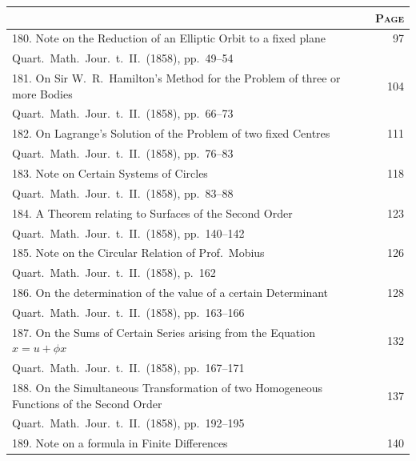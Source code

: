 \documentclass[12pt,a4paper]{article}
\theoremstyle{plain}
\begin{document}
\clearpage

\begin{longtable}{p{}r}
\toprule
\multicolumn{1}{c}{} & \multicolumn{1}{c}{\textsc{Page}} \\
\midrule
\endhead
180. Note on the Reduction of an Elliptic Orbit to a fixed plane \dotfill & 97 \\
\multicolumn{2}{l}{\small Quart.\ Math.\ Jour.\ t.~II.\ (1858), pp.~49--54} \\[0.5em]
%
181. On Sir W.~R.\ Hamilton's Method for the Problem of three or more Bodies \dotfill & 104 \\
\multicolumn{2}{l}{\small Quart.\ Math.\ Jour.\ t.~II.\ (1858), pp.~66--73} \\[0.5em]
%
182. On Lagrange's Solution of the Problem of two fixed Centres \dotfill & 111 \\
\multicolumn{2}{l}{\small Quart.\ Math.\ Jour.\ t.~II.\ (1858), pp.~76--83} \\[0.5em]
%
183. Note on Certain Systems of Circles \dotfill & 118 \\
\multicolumn{2}{l}{\small Quart.\ Math.\ Jour.\ t.~II.\ (1858), pp.~83--88} \\[0.5em]
%
184. A Theorem relating to Surfaces of the Second Order \dotfill & 123 \\
\multicolumn{2}{l}{\small Quart.\ Math.\ Jour.\ t.~II.\ (1858), pp.~140--142} \\[0.5em]
%
185. Note on the Circular Relation of Prof.\ Mobius \dotfill & 126 \\
\multicolumn{2}{l}{\small Quart.\ Math.\ Jour.\ t.~II.\ (1858), p.~162} \\[0.5em]
%
186. On the determination of the value of a certain Determinant \dotfill & 128 \\
\multicolumn{2}{l}{\small Quart.\ Math.\ Jour.\ t.~II.\ (1858), pp.~163--166} \\[0.5em]
%
187. On the Sums of Certain Series arising from the Equation $x = u + \phi x$ \dotfill & 132 \\
\multicolumn{2}{l}{\small Quart.\ Math.\ Jour.\ t.~II.\ (1858), pp.~167--171} \\[0.5em]
%
188. On the Simultaneous Transformation of two Homogeneous Functions of the Second Order \dotfill & 137 \\
\multicolumn{2}{l}{\small Quart.\ Math.\ Jour.\ t.~II.\ (1858), pp.~192--195} \\[0.5em]
%
189. Note on a formula in Finite Differences \dotfill & 140 \\

\end{longtable}
\end{document}
